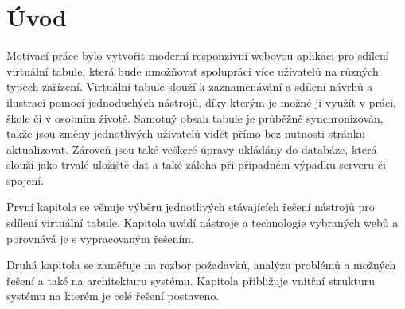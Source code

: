 \chapter{Úvod}
\label{chap:1}
Motivací práce bylo vytvořit moderní responzivní webovou aplikaci pro sdílení virtuální tabule, která bude umožňovat spolupráci více uživatelů na různých typech zařízení.
Virtuální tabule slouží k zaznamenávání a sdílení návrhů a ilustrací pomocí jednoduchých nástrojů, díky kterým je možné ji využít v práci, škole či v osobním životě.
Samotný obsah tabule je průběžně synchronizován, takže jsou změny jednotlivých uživatelů vidět přímo bez nutnosti stránku aktualizovat.
Zároveň jsou také veškeré úpravy ukládány do databáze, která slouží jako trvalé uložiště dat a také záloha při případném výpadku serveru či spojení.

První kapitola se věnuje výběru jednotlivých stávajících řešení nástrojů pro sdílení virtuální tabule.
Kapitola uvádí nástroje a technologie vybraných webů a porovnává je s vypracovaným řešením.

Druhá kapitola se zaměřuje na rozbor požadavků, analýzu problémů a možných řešení a také na architekturu systému.
Kapitola přibližuje vnitřní strukturu systému na kterém je celé řešení postaveno.

